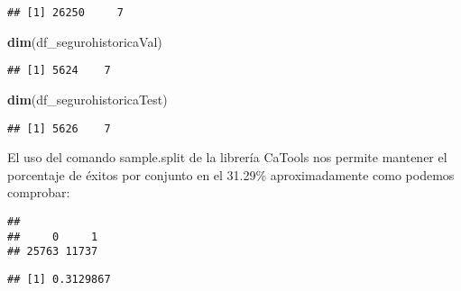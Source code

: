 \documentclass[]{article}
\newenvironment{Shaded}{\begin{snugshade}}{\end{snugshade}}
\newcommand{\KeywordTok}[1]{\textcolor[rgb]{0.13,0.29,0.53}{\textbf{#1}}}
\newcommand{\DecValTok}[1]{\textcolor[rgb]{0.00,0.00,0.81}{#1}}
\newcommand{\OperatorTok}[1]{\textcolor[rgb]{0.81,0.36,0.00}{\textbf{#1}}}
\newcommand{\NormalTok}[1]{#1}
\begin{document}
\begin{verbatim}
## [1] 26250     7
\end{verbatim}

\begin{Shaded}
\begin{Highlighting}[]
\KeywordTok{dim}\NormalTok{(df_segurohistoricaVal)}
\end{Highlighting}
\end{Shaded}

\begin{verbatim}
## [1] 5624    7
\end{verbatim}

\begin{Shaded}
\begin{Highlighting}[]
\KeywordTok{dim}\NormalTok{(df_segurohistoricaTest)}
\end{Highlighting}
\end{Shaded}

\begin{verbatim}
## [1] 5626    7
\end{verbatim}

El uso del comando sample.split de la librería CaTools nos permite
mantener el porcentaje de éxitos por conjunto en el 31.29\%
aproximadamente como podemos comprobar:

\begin{Shaded}
\end{Shaded}

\begin{verbatim}
## 
##     0     1 
## 25763 11737
\end{verbatim}

\begin{Shaded}
\end{Shaded}

\begin{verbatim}
## [1] 0.3129867
\end{verbatim}

\begin{Shaded}
\end{Shaded}
\end{document}

